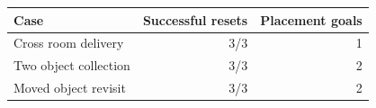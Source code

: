 \begin{tabular}{lrr}
\toprule
Case & Successful resets & Placement goals \\
\midrule
Cross room delivery & 3/3 & 1 \\
Two object collection & 3/3 & 2 \\
Moved object revisit & 3/3 & 2 \\
\bottomrule
\end{tabular}
